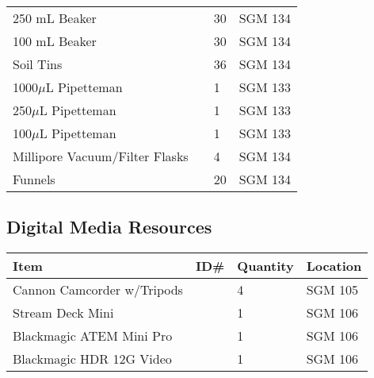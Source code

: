 \documentclass[12pt]{../SOP4_alpha}\usepackage[]{graphicx}\usepackage[]{color}
\begin{document}
\begin{tabular}{|l|l|l|l|}
250 mL Beaker          &&  30  & SGM 134 \\
100 mL Beaker          &&  30  & SGM 134 \\
Soil Tins                   && 36 & SGM 134\\
1000$\mu$L Pipetteman       && 1 & SGM 133\\
250$\mu$L Pipetteman        && 1 & SGM 133\\
100$\mu$L Pipetteman        && 1& SGM 133\\
Millipore Vacuum/Filter Flasks && 4 & SGM 134 \\
Funnels                     && 20 & SGM 134\\
\hline
\end{tabular}

\subsection{Digital Media Resources}
\begin{tabular}{|l|l|l|l|}
\hline
Item      & ID\#  & Quantity & Location \\ \hline
Cannon Camcorder w/Tripods   && 4 & SGM 105 \\
Stream Deck Mini && 1 & SGM 106 \\
Blackmagic ATEM Mini Pro && 1 & SGM 106\\
Blackmagic HDR 12G Video && 1 & SGM 106\\
\hline
\end{tabular}
\end{document}
